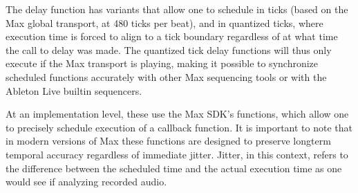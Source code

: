 \documentclass[letterpaper,10pt,english]{sphinxmanual}
\begin{document}
\begin{sphinxVerbatim}[commandchars=\\\{\}]

\end{sphinxVerbatim}

\sphinxAtStartPar
The delay function has variants that allow one to schedule
in ticks (based on the Max global transport, at 480 ticks per beat),
and in quantized ticks, where execution time is forced to align to a tick
boundary regardless of at what time the call to delay was made.
The quantized tick delay functions will thus only execute if the Max transport is
playing, making it possible to synchronize scheduled functions accurately
with other Max sequencing tools or with the Ableton Live built\sphinxhyphen{}in sequencers.

\begin{sphinxVerbatim}[commandchars=\\\{\}]

\end{sphinxVerbatim}

\sphinxAtStartPar
At an implementation level, these use the Max SDK’s  functions,
which allow one to precisely schedule
execution of a callback function. It is important to note that in
modern versions of Max these functions are designed to preserve
long\sphinxhyphen{}term temporal accuracy regardless of immediate jitter.
Jitter, in this context, refers to the difference between the scheduled
time and the actual execution time as one would see if analyzing recorded audio.
\end{document}
